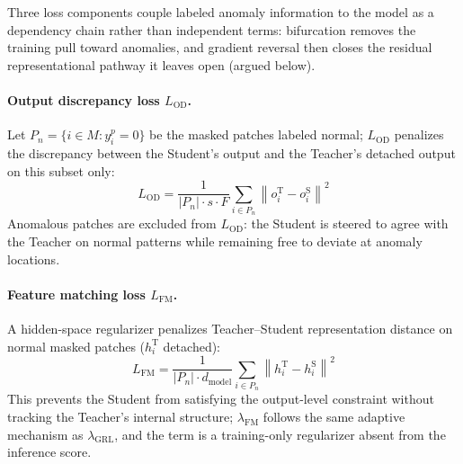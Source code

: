 Three loss components couple labeled anomaly information to the model as a dependency chain rather
than independent terms: bifurcation removes the training pull toward anomalies, and gradient
reversal then closes the residual representational pathway it leaves open (argued below).

\paragraph{Output discrepancy loss $L_{\mathrm{OD}}$.}
Let $P_n = \{i \in M : y^p_i = 0\}$ be the masked patches labeled normal; $L_{\mathrm{OD}}$
penalizes the discrepancy between the Student's output and the Teacher's detached output on this
subset only:
\begin{equation}
  L_{\mathrm{OD}} = \frac{1}{|P_n| \cdot s \cdot F}
    \sum_{i \in P_n} \left\| o^{\mathrm{T}}_i - o^{\mathrm{S}}_i \right\|^2
  \label{eq:lod}
\end{equation}
Anomalous patches are excluded from $L_{\mathrm{OD}}$: the Student is steered to agree with
the Teacher on normal patterns while remaining free to deviate at anomaly locations.

\paragraph{Feature matching loss $L_{\mathrm{FM}}$.}
A hidden-space regularizer penalizes Teacher--Student representation distance on normal masked
patches ($h^{\mathrm{T}}_i$ detached):
\begin{equation}
  L_{\mathrm{FM}} = \frac{1}{|P_n| \cdot d_{\mathrm{model}}}
    \sum_{i \in P_n} \left\| h^{\mathrm{T}}_i - h^{\mathrm{S}}_i \right\|^2
  \label{eq:lfm}
\end{equation}
This prevents the Student from satisfying the output-level constraint without tracking the
Teacher's internal structure; $\lambda_{\mathrm{FM}}$ follows the same adaptive mechanism as
$\lambda_{\mathrm{GRL}}$, and the term is a training-only regularizer absent from the inference
score.

